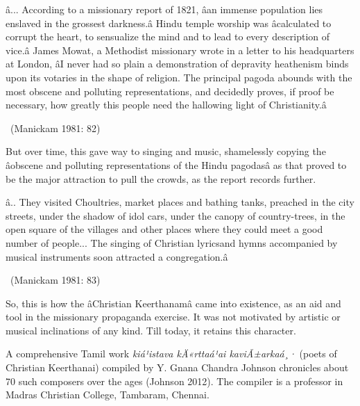 \begin{myquote}
â... According to a missionary report of 1821, âan immense population lies enslaved in the grossest darkness.â Hindu temple worship was âcalculated to corrupt the heart, to sensualize the mind and to lead to every description of vice.â James Mowat, a Methodist missionary wrote in a letter to his headquarters at London, âI never had so plain a demonstration of depravity heathenism binds upon its votaries in the shape of religion. The principal pagoda abounds with the most obscene and polluting representations, and decidedly proves, if proof be necessary, how greatly this people need the hallowing light of Christianity.â 

~\hfill (Manickam 1981: 82)
\end{myquote}

But over time, this gave way to singing and music, shamelessly copying the âobscene and polluting representations of the Hindu pagodasâ as that proved to be the major attraction to pull the crowds, as the report records further.

\begin{myquote}
â.. They visited Choultries, market places and bathing tanks, preached in the city streets, under the shadow of idol cars, under the canopy of country-trees, in the open square of the villages and other places where they could meet a good number of people... The singing of Christian lyricsand hymns accompanied by musical instruments soon attracted a congregation.â 

~\hfill (Manickam 1981: 83)
\end{myquote}

So, this is how the âChristian Keerthanamâ came into existence, as an aid and tool in the missionary propaganda exercise. It was not motivated by artistic or musical inclinations of any kind. Till today, it retains this character.

A comprehensive Tamil work \textit{kiá¹istava kÄ«rttaá¹ai kaviÃ±arkaá¸·} (poets of Christian Keerthanai) compiled by Y. Gnana Chandra Johnson chronicles about 70 such composers over the ages (Johnson 2012). The compiler is a professor in Madras Christian College, Tambaram, Chennai.

